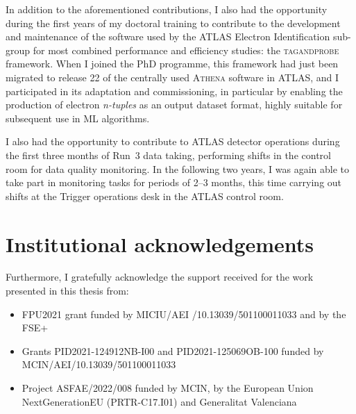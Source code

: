 In addition to the aforementioned contributions, I also had the opportunity during the first years of my doctoral training to contribute to the development and maintenance of the software used by the ATLAS Electron Identification sub-group for most combined performance and efficiency studies: the \textsc{tagandprobe} framework. When I joined the PhD programme, this framework had just been migrated to release 22 of the centrally used \textsc{Athena} software in ATLAS, and I participated in its adaptation and commissioning, in particular by enabling the production of electron \textit{n-tuples} as an output dataset format, highly suitable for subsequent use in ML algorithms.  

I also had the opportunity to contribute to ATLAS detector operations during the first three months of Run~3 data taking, performing shifts in the control room for data quality monitoring. In the following two years, I was again able to take part in monitoring tasks for periods of 2–3 months, this time carrying out shifts at the Trigger operations desk in the ATLAS control room.



\section*{Institutional acknowledgements}

Furthermore, I gratefully acknowledge the support received for the work presented in this thesis from:
\begin{itemize}
    \item FPU2021 grant funded by MICIU/AEI /10.13039/501100011033 and by the FSE+ 
    \item Grants PID2021-124912NB-I00 and PID2021-125069OB-100 funded by MCIN/AEI/10.13039/501100011033 
    \item Project ASFAE/2022/008 funded by MCIN, by the European Union NextGenerationEU (PRTR-C17.I01) and Generalitat Valenciana
\end{itemize}